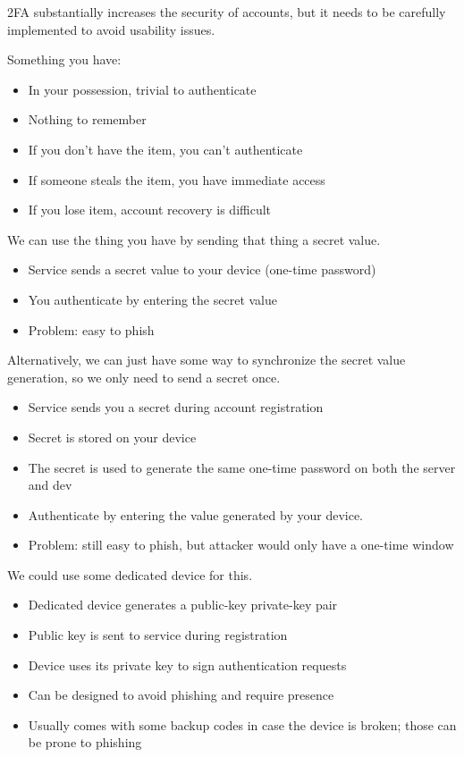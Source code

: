 \documentclass[code]{amznotes}
\begin{document}
2FA substantially increases the security of accounts, but it needs to be carefully implemented to avoid usability issues.

Something you have:
\begin{itemize}[noitemsep]
    \item In your possession, trivial to authenticate
    \item Nothing to remember
    \item If you don't have the item, you can't authenticate
    \item If someone steals the item, you have immediate access
    \item If you lose item, account recovery is difficult
\end{itemize}

We can use the thing you have by sending that thing a secret value.
\begin{itemize}[noitemsep]
    \item Service sends a secret value to your device (one-time password)
    \item You authenticate by entering the secret value
    \item Problem: easy to phish
\end{itemize}

Alternatively, we can just have some way to synchronize the secret value generation, so we only need to send a secret once.
\begin{itemize}[noitemsep]
    \item Service sends you a secret during account registration
    \item Secret is stored on your device
    \item The secret is used to generate the same one-time password on both the server and dev
    \item Authenticate by entering the value generated by your device.
    \item Problem: still easy to phish, but attacker would only have a one-time window
\end{itemize}

We could use some dedicated device for this.
\begin{itemize}[noitemsep]
    \item Dedicated device generates a public-key private-key pair
    \item Public key is sent to service during registration
    \item Device uses its private key to sign authentication requests
    \item Can be designed to avoid phishing and require presence
    \item Usually comes with some backup codes in case the device is broken; those can be prone to phishing
\end{itemize}
\end{document}
